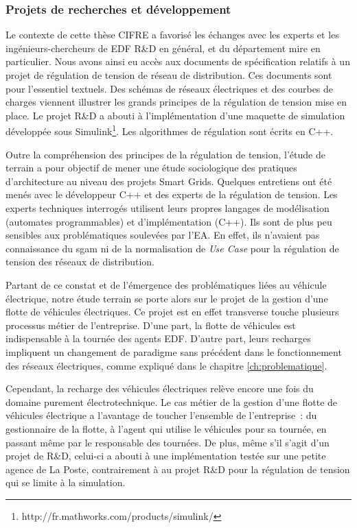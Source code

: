 \subsubsection{Projets de recherches et développement}
\label{motivations_cas_metier}

Le contexte de cette thèse CIFRE a favorisé les échanges avec les experts et les
ingénieurs-chercheurs de EDF R\&D en général, et du département \gls{mire} en
particulier. Nous avons ainsi eu accès aux documents de spécification relatifs à
un projet de régulation de tension de réseau de distribution. Ces documents sont
pour l'essentiel textuels. Des schémas de réseaux électriques et des courbes de
charges viennent illustrer les grands principes de la régulation de tension
mise en place. Le projet R\&D a abouti à l'implémentation d'une maquette de
simulation développée sous
Simulink\footnote{http://fr.mathworks.com/products/simulink/}. Les algorithmes
de régulation sont écrits en C++.

Outre la compréhension des principes de la régulation de tension, l'étude de
terrain a pour objectif de mener une étude sociologique des pratiques
d'architecture au niveau des projets Smart Grids. Quelques entretiens ont été
menés avec le développeur C++ et des experts de la régulation de tension. Les
experts techniques interrogés utilisent leurs propres langages de modélisation
(automates programmables) et d'implémentation (C++). Ils sont de plus peu
sensibles aux problématiques soulevées par l'EA. En effet, ils n'avaient pas
connaissance du \gls{sgam} ni de la normalisation de \textit{Use Case} pour la
régulation de tension des réseaux de distribution.

Partant de ce constat et de l'émergence des problématiques liées au véhicule
électrique, notre étude terrain se porte alors sur le projet de la gestion
d'une flotte de véhicules électriques. Ce projet est en effet transverse touche plusieurs processus métier de
l'entreprise. D'une part, la flotte de véhicules est indispensable à la tournée
des agents EDF. D'autre part, leurs recharges impliquent un changement de
paradigme sans précédent dans le fonctionnement des réseaux électriques, comme
expliqué dans le chapitre \ref{ch:problematique}.

Cependant, la recharge des véhicules électriques relève encore une fois du
domaine purement électrotechnique. Le cas métier de la gestion d'une flotte de
véhicules électrique a l'avantage de toucher l'ensemble de l'entreprise~: du
gestionnaire de la flotte, à l'agent qui utilise le véhicules pour sa tournée,
en passant même par le responsable des tournées. De plus, même s'il s'agit d'un
projet de R\&D, celui-ci a abouti à une implémentation testée sur une petite
agence de La Poste, contrairement à au projet R\&D pour la régulation de
tension qui se limite à la simulation.

